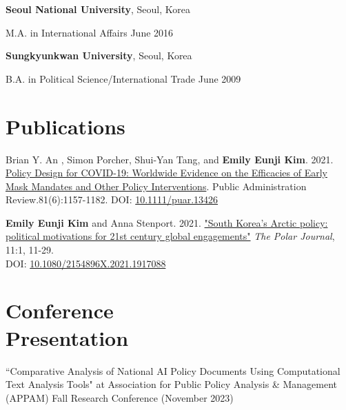 \documentclass[margin,line, 10pt]{res}
\begin{document}
\begin{resume}
{\bf Seoul National University}, Seoul, Korea

\vspace{-0.4cm}
M.A. in International Affairs \hfill {June 2016}

{\bf Sungkyunkwan University}, Seoul, Korea

\vspace{-0.4cm}
B.A. in Political Science/International Trade \hfill {June 2009}

\section{\sc Publications}
Brian Y. An , Simon Porcher, Shui-Yan Tang, and \textbf{Emily Eunji Kim}. 2021. \href{https://onlinelibrary.wiley.com/doi/full/10.1111/puar.13426}{Policy Design for COVID-19: Worldwide Evidence on the Efficacies of Early Mask Mandates and Other Policy Interventions}. Public Administration Review.81(6):1157-1182. DOI: \href{https://onlinelibrary.wiley.com/doi/full/10.1111/puar.13426}{10.1111/puar.13426}\\
\vspace{-.1cm}



\textbf{Emily Eunji Kim} and Anna Stenport. 2021. \href{https://www.tandfonline.com/doi/abs/10.1080/2154896X.2021.1917088?tab=permissions&scroll=top} {"South Korea’s Arctic policy: political motivations for 21st century global engagements"} \textit{The Polar Journal}, 11:1, 11-29.\\ 
DOI: \href{https://www.tandfonline.com/doi/abs/10.1080/2154896X.2021.1917088?tab=permissions&scroll=top}{10.1080/2154896X.2021.1917088}
\vspace{-.1cm}

\section{\sc Conference\\Presentation}
“Comparative Analysis of National AI Policy Documents Using Computational Text Analysis Tools" at Association for Public Policy Analysis \& Management (APPAM) Fall Research Conference (November 2023)
\vspace{-.1cm}


\end{resume}
\end{document}
